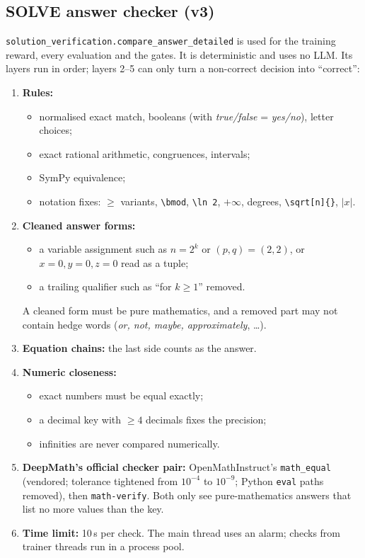 \documentclass[10pt,a4paper]{article}
\begin{document}
\subsection{SOLVE answer checker (v3)}
\texttt{solution\_verification.compare\_answer\_detailed} is used for the training reward, every evaluation and the
gates. It is deterministic and uses no LLM. Its layers run in order; layers 2--5 can only turn a non-correct
decision into ``correct'':
\begin{enumerate}
\item \textbf{Rules:}
  \begin{itemize}
  \item normalised exact match, booleans (with \emph{true/false} = \emph{yes/no}), letter choices;
  \item exact rational arithmetic, congruences, intervals;
  \item SymPy equivalence;
  \item notation fixes: $\geq$ variants, \verb|\bmod|, \verb|\ln 2|, $+\infty$, degrees, \verb|\sqrt[n]{}|, $|x|$.
  \end{itemize}
\item \textbf{Cleaned answer forms:}
  \begin{itemize}
  \item a variable assignment such as $n=2^k$ or $(p,q)=(2,2)$, or $x=0,y=0,z=0$ read as a tuple;
  \item a trailing qualifier such as ``for $k\ge1$'' removed.
  \end{itemize}
  A cleaned form must be pure mathematics, and a removed part may not contain hedge words (\emph{or, not, maybe,
  approximately}, \dots).
\item \textbf{Equation chains:} the last side counts as the answer.
\item \textbf{Numeric closeness:}
  \begin{itemize}
  \item exact numbers must be equal exactly;
  \item a decimal key with $\ge4$ decimals fixes the precision;
  \item infinities are never compared numerically.
  \end{itemize}
\item \textbf{DeepMath's official checker pair:} OpenMathInstruct's \texttt{math\_equal} (vendored; tolerance
      tightened from $10^{-4}$ to $10^{-9}$; Python \texttt{eval} paths removed), then \texttt{math-verify}. Both
      only see pure-mathematics answers that list no more values than the key.
\item \textbf{Time limit:} 10\,s per check. The main thread uses an alarm; checks from trainer threads run in a process
      pool.
\end{enumerate}
\end{document}
